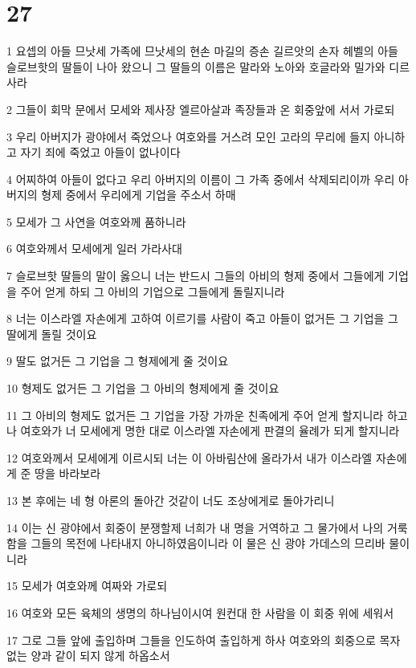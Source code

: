 \chapter{27}

\par 1 요셉의 아들 므낫세 가족에 므낫세의 현손 마길의 증손 길르앗의 손자 헤벨의 아들 슬로브핫의 딸들이 나아 왔으니 그 딸들의 이름은 말라와 노아와 호글라와 밀가와 디르사라
\par 2 그들이 회막 문에서 모세와 제사장 엘르아살과 족장들과 온 회중앞에 서서 가로되
\par 3 우리 아버지가 광야에서 죽었으나 여호와를 거스려 모인 고라의 무리에 들지 아니하고 자기 죄에 죽었고 아들이 없나이다
\par 4 어찌하여 아들이 없다고 우리 아버지의 이름이 그 가족 중에서 삭제되리이까 우리 아버지의 형제 중에서 우리에게 기업을 주소서 하매
\par 5 모세가 그 사연을 여호와께 품하니라
\par 6 여호와께서 모세에게 일러 가라사대
\par 7 슬로브핫 딸들의 말이 옳으니 너는 반드시 그들의 아비의 형제 중에서 그들에게 기업을 주어 얻게 하되 그 아비의 기업으로 그들에게 돌릴지니라
\par 8 너는 이스라엘 자손에게 고하여 이르기를 사람이 죽고 아들이 없거든 그 기업을 그 딸에게 돌릴 것이요
\par 9 딸도 없거든 그 기업을 그 형제에게 줄 것이요
\par 10 형제도 없거든 그 기업을 그 아비의 형제에게 줄 것이요
\par 11 그 아비의 형제도 없거든 그 기업을 가장 가까운 친족에게 주어 얻게 할지니라 하고 나 여호와가 너 모세에게 명한 대로 이스라엘 자손에게 판결의 율례가 되게 할지니라
\par 12 여호와께서 모세에게 이르시되 너는 이 아바림산에 올라가서 내가 이스라엘 자손에게 준 땅을 바라보라
\par 13 본 후에는 네 형 아론의 돌아간 것같이 너도 조상에게로 돌아가리니
\par 14 이는 신 광야에서 회중이 분쟁할제 너희가 내 명을 거역하고 그 물가에서 나의 거룩함을 그들의 목전에 나타내지 아니하였음이니라 이 물은 신 광야 가데스의 므리바 물이니라
\par 15 모세가 여호와께 여짜와 가로되
\par 16 여호와 모든 육체의 생명의 하나님이시여 원컨대 한 사람을 이 회중 위에 세워서
\par 17 그로 그들 앞에 출입하며 그들을 인도하여 출입하게 하사 여호와의 회중으로 목자 없는 양과 같이 되지 않게 하옵소서
